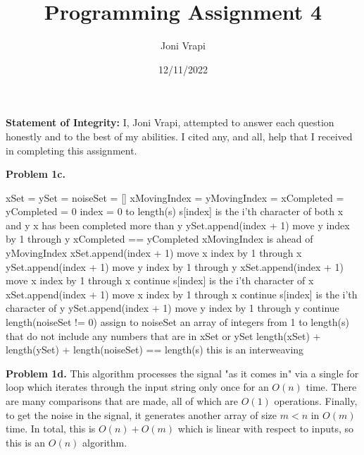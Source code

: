 \documentclass{article}
\title{Programming Assignment 4}
\author{Joni Vrapi}
\date{12/11/2022}
\begin{document}
\maketitle

\textbf{Statement of Integrity:} I, Joni Vrapi, attempted to answer each question honestly and to the best of my abilities. I cited any, and all, help that I received in completing this assignment.

\hfill

\textbf{Problem 1c.} 

\begin{codebox}
    \li xSet = ySet = noiseSet = []
    \li xMovingIndex = yMovingIndex = xCompleted = yCompleted = 0
    \li \For index = 0 to length(s) \Do
    \li \If s[index] is the i'th character of both x and y \Then
    \li \If x has been completed more than y \Then
    \li ySet.append(index + 1)
    \li move y index by 1 through y 
    \li \ElseIf xCompleted == yCompleted \Then
    \li \If xMovingIndex is ahead of yMovingIndex \Then
    \li xSet.append(index + 1)
    \li move x index by 1 through x
    \li \Else 
    \li ySet.append(index + 1)
    \li move y index by 1 through y \End
    \li \Else
    \li xSet.append(index + 1)
    \li move x index by 1 through x \End
    \li continue \End
    \li
    \li \If s[index] is the i'th character of x \Then
    \li xSet.append(index + 1)
    \li move x index by 1 through x 
    \li continue \End
    \li
    \li \If s[index] is the i'th character of y \Then
    \li ySet.append(index + 1)
    \li move y index by 1 through y
    \li continue \End
    \li
    \li \If length(noiseSet != 0) \Then
    \li assign to noiseSet an array of integers from 1 to length(s) 
    \li that do not include any numbers that are in xSet or ySet \End
    \li
    \li \If length(xSet) + length(ySet) + length(noiseSet) == length(s) \Then
    \li this is an interweaving \End
\end{codebox}

\hfill

\textbf{Problem 1d.} This algorithm processes the signal "as it comes in" via a single for loop which iterates through the input string only once for an $O(n)$ time. There are many comparisons that are made, all of which are $O(1)$ operations. Finally, to get the noise in the signal, it generates another array of size $m < n$ in $O(m)$ time. In total, this is $O(n) + O(m)$ which is linear with respect to inputs, so this is an $O(n)$ algorithm.

\newpage
 

\end{document}
